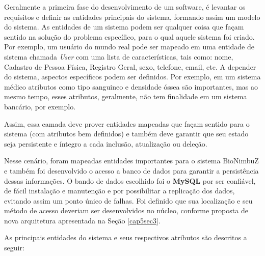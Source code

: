 Geralmente a primeira fase do desenvolvimento de um software, é levantar os requisitos e definir as entidades principais do sistema, formando assim um modelo do sistema. As entidades de um sistema podem ser qualquer coisa que façam sentido na solução do problema específico, para o qual aquele sistema foi criado. Por exemplo, um usuário do mundo real pode ser mapeado em uma entidade de sistema chamada \textit{User} com uma lista de características, tais como: nome, Cadastro de Pessoa Física, Registro Geral, sexo, telefone, email, etc. A depender do sistema, aspectos específicos podem ser definidos. Por exemplo, em um sistema médico atributos como tipo sanguineo e densidade óssea são importantes, mas ao mesmo tempo, esses atributos, geralmente, não tem finalidade em um sistema bancário, por exemplo.

Assim, essa camada deve prover entidades mapeadas que façam sentido para o sistema (com atributos bem definidos) e também deve garantir que seu estado seja persistente e íntegro a cada inclusão, atualização ou deleção. 

Nesse cenário, foram mapeadas entidades importantes para o sistema BioNimbuZ e também foi desenvolvido o acesso a banco de dados para garantir a persistência dessas informações. O bando de dados escolhido foi o \textbf{MySQL} \cite{mysql_url} por ser confiável, de fácil instalação e manutenção e por possibilitar a replicação dos dados, evitando assim um ponto único de falhas. Foi definido que sua localização e seu método de acesso deveriam ser desenvolvidos no núcleo, conforme proposta de nova arquitetura apresentada na Seção \ref{cap5sec3}.

As principais entidades do sistema e seus respectivos atributos são descritos a seguir:

